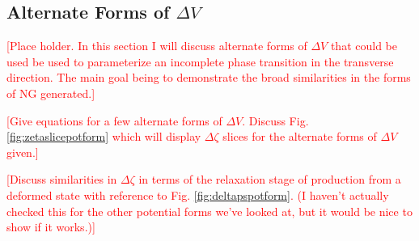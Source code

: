 



\subsection{Alternate Forms of $\Delta V$}
\textcolor{red}{[Place holder. In this section I will discuss alternate forms of $\Delta V$ that could be used be used to parameterize an incomplete phase transition in the transverse direction. The main goal being to demonstrate the broad similarities in the forms of NG generated.]}

\Fzetaslicepotform

\textcolor{red}{[Give equations for a few alternate forms of $\Delta V$. Discuss Fig. \ref{fig:zetaslicepotform} which will display $\Delta\zeta$ slices for the alternate forms of $\Delta V$ given.]}

\Fdeltapspotform

\textcolor{red}{[Discuss similarities in $\Delta\zeta$ in terms of the relaxation stage of production from a deformed state with reference to Fig. \ref{fig:deltapspotform}. (I haven't actually checked this for the other potential forms we've looked at, but it would be nice to show if it works.)]}
